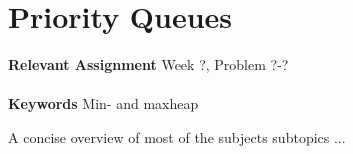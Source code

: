 
\chapter{Priority Queues}
\label{ch:priorityqueues}

\textbf{Relevant Assignment} Week ?, Problem ?-?\\\\
\textbf{Keywords} Min- and maxheap
\vspace{1in}

\noindent A concise overview of most of the subjects subtopics ...
